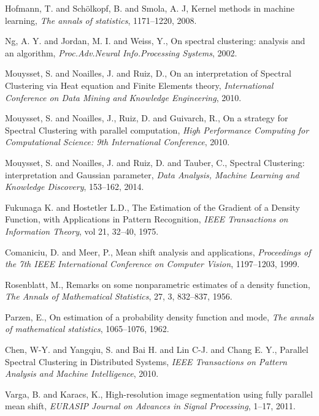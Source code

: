\documentclass{llncs}
\begin{document}
\begin{thebibliography}{5}
{
{Hofmann, T. and Sch{\"o}lkopf, B. and Smola, A. J},
{Kernel methods in machine learning},
\emph{The annals of statistics},
{1171--1220},
{2008}.

Ng, A. Y. and Jordan, M. I. and Weiss, Y.,
On spectral clustering: analysis and an algorithm,
\emph{Proc.Adv.Neural Info.Processing Systems},
2002.

Mouysset, S. and Noailles, J. and Ruiz, D.,
On an interpretation of Spectral Clustering via Heat equation and Finite
Elements theory,
\emph{International Conference on Data Mining and Knowledge Engineering},
2010.

Mouysset, S. and Noailles, J., Ruiz, D. and Guivarch, R.,
On a strategy for Spectral Clustering with parallel computation,
\emph{High Performance Computing for Computational Science: 9th International Conference},
2010.

Mouysset, S. and Noailles, J. and Ruiz, D. and Tauber, C.,
{Spectral Clustering: interpretation and Gaussian parameter},
\emph{Data Analysis, Machine Learning and Knowledge Discovery},
153--162, 2014.

Fukunaga K. and Hostetler L.D., 
{The Estimation of the Gradient of a Density Function, with Applications in Pattern Recognition},
\emph{IEEE Transactions on Information Theory},
vol 21, 32--40, 1975.

Comaniciu, D. and Meer, P.,
Mean shift analysis and applications,
\emph{Proceedings of the 7th IEEE International Conference on Computer Vision},
1197--1203, 1999.

Rosenblatt, M.,
Remarks on some nonparametric estimates of a density function,
\emph{The Annals of Mathematical Statistics},
27, 3, 832--837, 1956.

Parzen, E.,
On estimation of a probability density function and mode,
\emph{The annals of mathematical statistics},
1065--1076, 1962.



Chen, W-Y. and Yangqiu, S. and Bai H. and Lin C-J. and Chang E. Y.,
Parallel Spectral Clustering in Distributed Systems,
\emph{IEEE Transactions on Pattern Analysis and Machine Intelligence},
2010.

Varga, B. and Karacs, K.,
High-resolution image segmentation using fully parallel mean shift,
\emph{EURASIP Journal on Advances in Signal Processing},
{1--17}, 2011.

}
\end{thebibliography}
\end{document}
